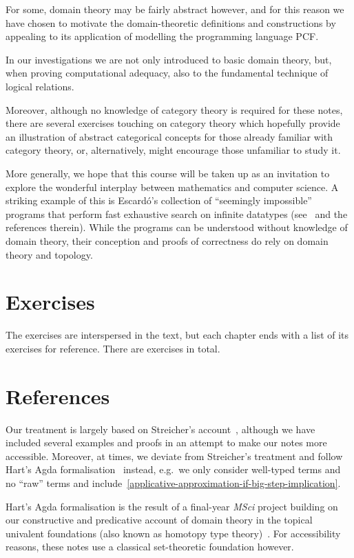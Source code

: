 For some, domain theory may be fairly abstract however, and for this reason we
have chosen to motivate the domain-theoretic definitions and constructions by
appealing to its application of modelling the programming language PCF.

In our investigations we are not only introduced to basic domain theory, but,
when proving computational adequacy, also to the fundamental technique of
logical relations.

Moreover, although no knowledge of category theory is required for these notes,
there are several exercises touching on category theory which hopefully provide
an illustration of abstract categorical concepts for those already familiar with
category theory, or, alternatively, might encourage those unfamiliar to study it.

More generally, we hope that this course will be taken up as an invitation to
explore the wonderful interplay between mathematics and computer science.
%
A striking example of this is Escard\'o's collection of ``seemingly impossible''
programs that perform fast exhaustive search on infinite datatypes
(see~\cite{Escardo2007b} and the references therein).
%
While the programs can be understood without knowledge of domain theory, their
conception and proofs of correctness do rely on domain theory and topology.

\section{Exercises}

The exercises are interspersed in the text, but each chapter ends with a list of
its exercises for reference.
%
There are  exercises in total.

\section{References}

Our treatment is largely based on Streicher's account~\cite{Streicher2006},
although we have included several examples and proofs in an attempt to make our
notes more accessible.
%
Moreover, at times, we deviate from Streicher's treatment and follow Hart's Agda
formalisation~\cite{Hart2020} instead, e.g.\ we only consider well-typed terms
and no ``raw'' terms and
include~\cref{applicative-approximation-if-big-step-implication}.

Hart's Agda formalisation is the result of a final-year \emph{MSci} project
building on our constructive and predicative account of domain theory in the
topical univalent foundations (also known as homotopy type
theory)~\cite{deJong2022}. For accessibility reasons, these notes use a
classical set-theoretic foundation however.

